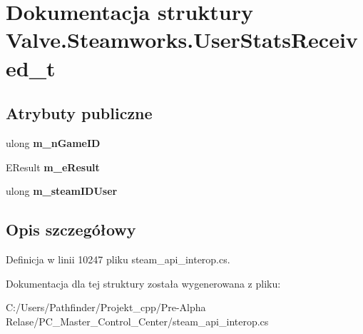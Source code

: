 \hypertarget{struct_valve_1_1_steamworks_1_1_user_stats_received__t}{}\section{Dokumentacja struktury Valve.\+Steamworks.\+User\+Stats\+Received\+\_\+t}
\label{struct_valve_1_1_steamworks_1_1_user_stats_received__t}
\subsection*{Atrybuty publiczne}
\begin{DoxyCompactItemize}
\item 
\mbox{\label{struct_valve_1_1_steamworks_1_1_user_stats_received__t_acc97f1f636e8fd9a239d507b3b9658e3}} 
ulong {\bfseries m\+\_\+n\+Game\+ID}
\item 
\mbox{\label{struct_valve_1_1_steamworks_1_1_user_stats_received__t_a5f52a90b5cfce390caaef5d5ebb677c7}} 
E\+Result {\bfseries m\+\_\+e\+Result}
\item 
\mbox{\label{struct_valve_1_1_steamworks_1_1_user_stats_received__t_ae03f7ab927b762878032c1c751237916}} 
ulong {\bfseries m\+\_\+steam\+I\+D\+User}
\end{DoxyCompactItemize}


\subsection{Opis szczegółowy}


Definicja w linii 10247 pliku steam\+\_\+api\+\_\+interop.\+cs.



Dokumentacja dla tej struktury została wygenerowana z pliku\+:\begin{DoxyCompactItemize}
\item 
C\+:/\+Users/\+Pathfinder/\+Projekt\+\_\+cpp/\+Pre-\/\+Alpha Relase/\+P\+C\+\_\+\+Master\+\_\+\+Control\+\_\+\+Center/steam\+\_\+api\+\_\+interop.\+cs\end{DoxyCompactItemize}
